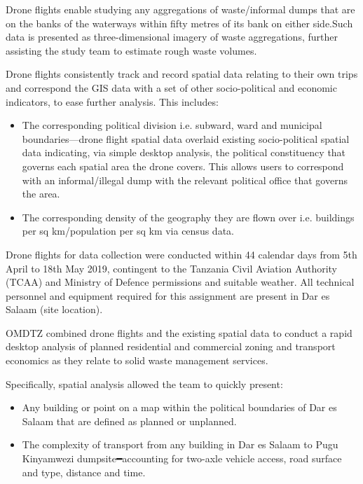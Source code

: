 \documentclass[a4paper,12pt,twoside]{article}
\begin{document}
    Drone flights enable studying any aggregations of waste/informal dumps that are on the banks of the waterways within fifty metres of its bank on either side.Such data is presented as three-dimensional imagery of waste aggregations, further assisting the study team to estimate rough waste volumes.  

    Drone flights consistently track and record spatial data relating to their own trips and correspond the GIS data with a set of other socio-political and economic indicators, to ease further analysis. This includes:
    \begin{itemize}
        \item The corresponding political division i.e. subward, ward and municipal boundaries—drone flight spatial data overlaid existing socio-political spatial data indicating, via simple desktop analysis, the political constituency that governs each spatial area the drone covers. This allows users to correspond with an informal/illegal dump with the relevant political office that governs the area.
        \item The corresponding density of the geography they are flown over i.e. buildings per sq km/population per sq km via census data.
    \end{itemize}  

    Drone flights for data collection were conducted within 44 calendar days from 5th April to 18th May 2019, contingent  to the Tanzania Civil Aviation Authority (TCAA) and Ministry of Defence permissions and suitable weather. All technical personnel and equipment required for this assignment are present in Dar es Salaam (site location).
    
    OMDTZ  combined drone flights and the existing spatial data to conduct a rapid desktop analysis of planned residential and commercial zoning and transport economics as they relate to solid waste management services. 

    Specifically, spatial analysis allowed the team to quickly present:
    \begin{itemize}
    \item Any building or point on a map within the political boundaries of Dar es Salaam that are defined as planned or unplanned.   
    \item The complexity of transport from any building in Dar es Salaam to Pugu Kinyamwezi dumpsite━accounting for two-axle vehicle access, road surface and type, distance and time. 
    \end{itemize} 
\end{document}
